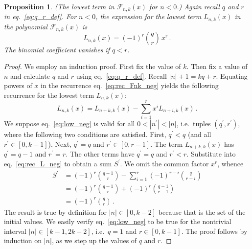 \documentclass[review]{elsarticle}
\theoremstyle{plain}
\newtheorem{proposition}[theorem]{Proposition}
\begin{document}
\begin{proposition}\label{prop:low_neg}
(The lowest term in $\mathcal{F}_{n,k}(x)$ for $n<0$.)
Again recall $q$ and $r$ in eq.~\eqref{eq:q_r_def}.
For $n<0$, the expression for the lowest term $L_{n,k}(x)$ in the polynomial $\mathcal{F}_{n,k}(x)$ is
\begin{equation}  
\label{eq:low_neg}
  L_{n,k}(x) = (-1)^r \binom{q}{r}\,x^r \,.
\end{equation}
The binomial coefficient vanishes if $q<r$.
\end{proposition}
\begin{proof}
We employ an induction proof.
First fix the value of $k$.
Then fix a value of $n$ and calculate $q$ and $r$ using eq.~\eqref{eq:q_r_def}.
Recall $|n|+1 = kq+r$.
Equating powers of $x$ in the recurrence eq.~\eqref{eq:rec_Fnk_neg}
yields the following recurrence for the lowest term $L_{n,k}(x)$:
\begin{equation}  
\label{eq:rec_L_neg}
  L_{n,k}(x) = L_{n+k,k}(x) -\sum_{i=1}^r x^i L_{n+i,k}(x) \,.
\end{equation}
We suppose eq.~\eqref{eq:low_neg} is valid for all $0 < |n^\prime| < |n|$,
i.e.~tuples $(q^\prime,r^\prime)$, where the following two conditions are satisfied.
First, $q^\prime < q$ (and all $r^\prime \in[0,k-1]$).
Next, $q^\prime = q$ and $r^\prime \in[0,r-1]$.
The term $L_{n+k,k}(x)$ has $q^\prime=q-1$ and $r^\prime=r$.
The other terms have $q^\prime=q$ and $r^\prime < r$.
Substitute into eq.~\eqref{eq:rec_L_neg} to obtain a sum $S^\prime$. We omit the common factor $x^r$, whence
\begin{equation}  
\begin{split}  
  S^\prime &= (-1)^r\binom{q-1}{r} -\sum_{i=1}^r (-1)^{r-i}\binom{q}{r-i}
  \\
  &= (-1)^r\binom{q-1}{r} +(-1)^r\binom{q-1}{r-1}
  \\
  &= (-1)^r\binom{q}{r} \,.
\end{split}  
\end{equation}
The result is true by definition for $|n|\in[0,k-2]$ because that is the set of the initial values.
We easily verify eq.~\eqref{eq:low_neg} to be true for the nontrivial interval $|n|\in[k-1,2k-2]$, i.e.~$q=1$ and $r\in[0,k-1]$.
The proof follows by induction on $|n|$, as we step up the values of $q$ and $r$.
\end{proof}
\end{document}
